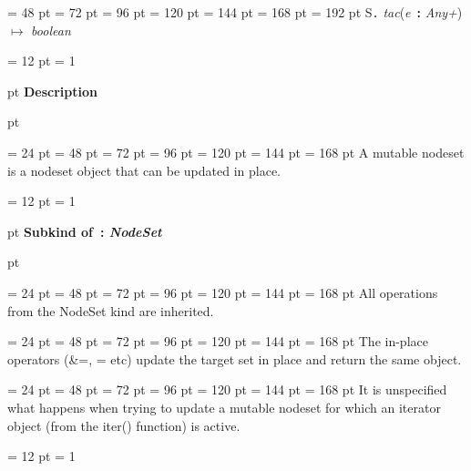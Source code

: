 {{{{\par \noindent  \leftskip = 48 pt  \leftmargini = 72 pt  \leftmarginii = 96 pt  \leftmarginiii = 120 pt  \leftmarginiv = 144 pt  \leftmarginv = 168 pt  \leftmarginvi = 192 pt S{\large {\tt .\/} {\em tac\/}}({\em e\/}~{\bf :}  {\em Any+\/}) \(\mapsto \)  {\em boolean\/}\par}
\par}
\par}
{\par \pagebreak[3.300000] \noindent \hangindent = 12 pt \hangafter = 1 
{\par \pagebreak[3]  pt \noindent
{\Large {\bf Description\/}}\par {} pt
} \noindent
\par}
{\par \noindent  \leftskip = 24 pt  \leftmargini = 48 pt  \leftmarginii = 72 pt  \leftmarginiii = 96 pt  \leftmarginiv = 120 pt  \leftmarginv = 144 pt  \leftmarginvi = 168 pt  A mutable nodeset is a nodeset object that can be updated in place. \par}
{\par \pagebreak[3.300000] \noindent \hangindent = 12 pt \hangafter = 1 
{\par \pagebreak[3]  pt \noindent
{\Large {\bf Subkind of~{\bf :}  {\em NodeSet\/}\/}}\par {} pt
} \noindent
\par}
{\par \noindent  \leftskip = 24 pt  \leftmargini = 48 pt  \leftmarginii = 72 pt  \leftmarginiii = 96 pt  \leftmarginiv = 120 pt  \leftmarginv = 144 pt  \leftmarginvi = 168 pt  All operations from the NodeSet kind are inherited.\par}
{\par \noindent  \leftskip = 24 pt  \leftmargini = 48 pt  \leftmarginii = 72 pt  \leftmarginiii = 96 pt  \leftmarginiv = 120 pt  \leftmarginv = 144 pt  \leftmarginvi = 168 pt  The in-place operators ({\&}=, {\textbar}= etc) update the target set in place
and return the same object.\par}
{\par \noindent  \leftskip = 24 pt  \leftmargini = 48 pt  \leftmarginii = 72 pt  \leftmarginiii = 96 pt  \leftmarginiv = 120 pt  \leftmarginv = 144 pt  \leftmarginvi = 168 pt  It is unspecified what happens when trying to update a mutable nodeset
for which an iterator object (from the iter() function) is active.
\par}
{\par \pagebreak[3.300000] \noindent \hangindent = 12 pt \hangafter = 1 
}}
